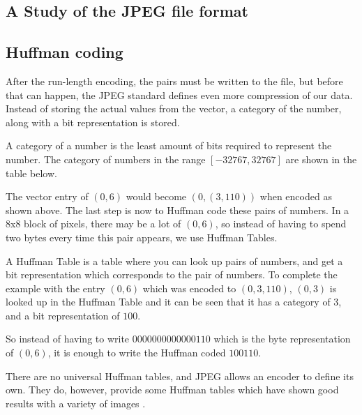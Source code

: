 \begin{infobox}{\section[A Study of the JPEG file format]{A Study of the JPEG file format}}
\subsection*{Huffman coding}
After the run-length encoding, the pairs must be written to the file, but before that can happen, the JPEG standard defines even more compression of our data. Instead of storing the actual values from the vector, a category of the number, along with a bit representation is stored. 

A category of a number is the least amount of bits required to represent the number. The category of numbers in the range $[-32767, 32767]$ are shown in the table below.

\begin{centering}
\end{centering}

The vector entry of $(0,6)$ would become $(0,(3,110))$ when encoded as shown above. The last step is now to Huffman code these pairs of numbers. In a 8x8 block of pixels, there may be a lot of $(0,6)$, so instead of having to spend two bytes every time this pair appears, we use Huffman Tables. 

A Huffman Table is a table where you can look up pairs of numbers, and get a bit representation which corresponds to the pair of numbers. To complete the example with the entry $(0,6)$ which was encoded to $(0,3,110)$, $(0,3)$ is looked up in the Huffman Table and it can be seen that it has a category of $3$, and a bit representation of $100$. 

So instead of having to write $0000 0000 0000 0110$ which is the byte representation of $(0,6)$, it is enough to write the Huffman coded $100110$.

There are no universal Huffman tables, and JPEG allows an encoder to define its own. They do, however, provide some Huffman tables which have shown good results with a variety of images \citep[p. 153]{JPEGStandard}. 


\end{infobox}
